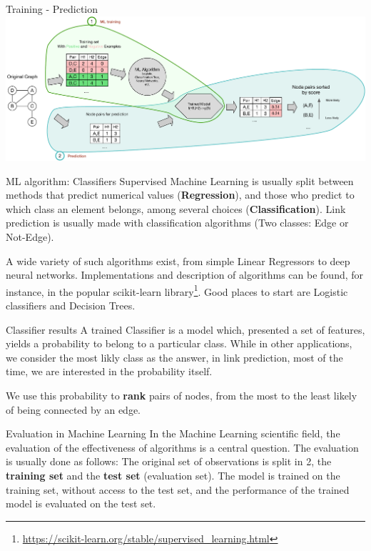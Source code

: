 \documentclass[a4paper,11pt]{book}
\begin{document}
\begin{textbox}{Training - Prediction}
\includegraphics[width=\textwidth]{pics/train-predict.pdf}
\end{textbox}


\begin{textbox}{ML algorithm: Classifiers}
Supervised Machine Learning is usually split between methods that predict numerical values (\textbf{Regression}), and those who predict to which class an element belongs, among several choices (\textbf{Classification}). Link prediction is usually made with classification algorithms (Two classes: Edge or Not-Edge). 

A wide variety of such algorithms exist, from simple Linear Regressors to deep neural networks. Implementations and description of algorithms can be found, for instance, in the popular scikit-learn library\footnote{\url{https://scikit-learn.org/stable/supervised_learning.html}}. Good places to start are Logistic classifiers and Decision Trees.
\end{textbox}






\begin{textbox}{Classifier results}
A trained Classifier is a model which, presented a set of features, yields a probability to belong to a particular class. While in other applications, we consider the most likly class as the answer, in link prediction, most of the time, we are interested in the probability itself. 

We use this probability to \textbf{rank} pairs of nodes, from the most to the least likely of being connected by an edge.
\end{textbox}




\begin{textbox}{Evaluation in Machine Learning}
In the Machine Learning scientific field, the evaluation of the effectiveness of algorithms is a central question. The evaluation is usually done as follows: The original set of observations is split in 2, the \textbf{training set} and the \textbf{test set} (evaluation set). The model is trained on the training set, without access to the test set, and the performance of the trained model is evaluated on the test set.

\end{textbox}
\end{document}
